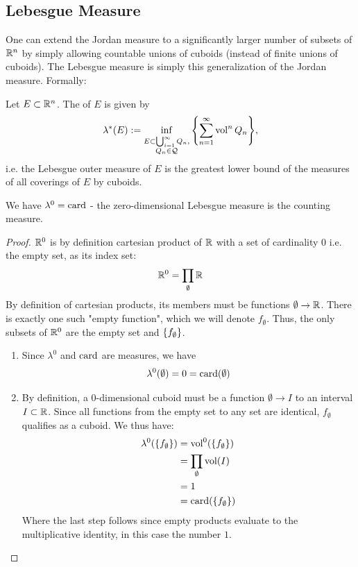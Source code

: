 \subsection{Lebesgue Measure}
One can extend the Jordan measure to a significantly larger number of subsets of $\mathbb{R}^n$ by simply allowing countable unions of cuboids (instead of finite unions of cuboids). The Lebesgue measure is simply this generalization of the Jordan measure. Formally:
\begin{definition}
	Let $E \subset \mathbb{R}^n$. The  of $E$ is given by
	\begin{align*}
		\lambda^*(E) := \inf_{\substack{E \subset \bigcup_{i = 1}^\infty Q_n,\\ Q_n \in \cQ}} \lr{\sum_{n = 1}^\infty \vol^n{Q_n}},
	\end{align*}
	i.e. the Lebesgue outer measure of $E$ is the greatest lower bound of the measures of all coverings of $E$ by cuboids.
\end{definition}
\begin{theorem}
	We have $\lambda^0 = \operatorname{card}$ - the zero-dimensional Lebesgue measure is the counting measure.
\end{theorem}
\begin{proof}
	$\mathbb{R}^0$ is by definition cartesian product of $\mathbb{R}$ with a set of cardinality $0$ i.e. the empty set, as its index set:
	\begin{align*}
		\mathbb{R}^0 = \prod_\emptyset \mathbb{R}
	\end{align*}
	By definition of cartesian products, its members must be functions $\emptyset \to \mathbb{R}$. There is exactly one such "empty function", which we will denote $f_\emptyset$. Thus, the only subsets of $\mathbb{R}^0$ are the empty set and $\qty{f_\emptyset}$.
	\begin{enumerate}
		\item Since $\lambda^0$ and $\operatorname{card}$ are measures, we have 
		\begin{align*}
			\lambda^0(\emptyset) = 0 = \operatorname{card}(\emptyset)
		\end{align*}
		\item By definition, a $0$-dimensional cuboid must be a function $\emptyset \to I$ to an interval $I \subset \mathbb{R}$. Since all functions from the empty set to any set are identical, $f_\emptyset$ qualifies as a cuboid. We thus have:
		\begin{align*}
			\lambda^0(\qty{f_\emptyset}) 
			&= \operatorname{vol}^0(\qty{f_\emptyset})\\ 
			&= \prod_{\emptyset} \operatorname{vol}(I)\\
			&= 1\\
			&= \operatorname{card}(\qty{f_\emptyset})
		\end{align*}
		Where the last step follows since empty products evaluate to the multiplicative identity, in this case the number $1$.
	\end{enumerate}
\end{proof}
